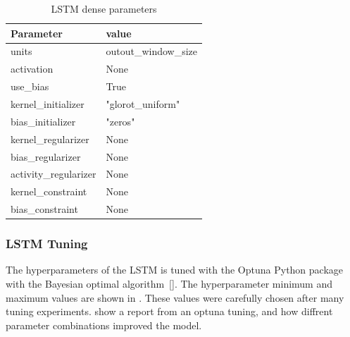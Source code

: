 \begin{table}[h]
  \centering
  \caption{LSTM dense parameters}
  \label{table:LSTM-dense-cell-parameters}
  \begin{tabular}{|l|l|}\hline
    Parameter             & value                \\ \hline
    \hline
    units                 & outout\_window\_size \\
    activation            & None                 \\
    use\_bias             & True                 \\
    kernel\_initializer   & "glorot\_uniform"    \\
    bias\_initializer     & "zeros"              \\
    kernel\_regularizer   & None                 \\
    bias\_regularizer     & None                 \\
    activity\_regularizer & None                 \\
    kernel\_constraint    & None                 \\
    bias\_constraint      & None                 \\
    \hline
  \end{tabular}
\end{table}

\subsubsection{LSTM Tuning}
The hyperparameters of the LSTM is tuned with the Optuna Python package
with the Bayesian optimal algorithm [].
The hyperparameter minimum and maximum values are shown in .
These values were carefully chosen after many tuning experiments.
 show a report from an optuna tuning,
and how diffrent parameter combinations improved the model.


